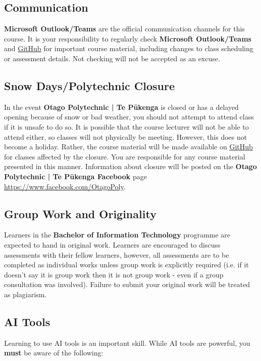\documentclass{article}
\begin{document}
\subsection*{Communication}
\textbf{Microsoft Outlook/Teams} are the official communication channels for this course. It is your responsibility to regularly check \textbf{Microsoft Outlook/Teams} and \href{https://github.com/otago-polytechnic-bit-courses/ID721001-mobile-application-development}{GitHub} for important course material, including changes to class scheduling or assessment details. Not checking will not be accepted as an excuse.

\subsection*{Snow Days/Polytechnic Closure}
In the event \textbf{Otago Polytechnic | Te Pūkenga} is closed or has a delayed opening because of snow or bad weather, you should not attempt to attend class if it is unsafe to do so. It is possible that the course lecturer will not be able to attend either, so classes will not physically be meeting. However, this does not become a holiday. Rather, the course material will be made available on \href{https://github.com/otago-polytechnic-bit-courses/ID721001-mobile-application-development}{GitHub} for classes affected by the closure. You are responsible for any course material presented in this manner. Information about closure will be posted on the \textbf{Otago Polytechnic | Te Pūkenga Facebook} page \href{https://www.facebook.com/OtagoPoly}{https://www.facebook.com/OtagoPoly}.

\subsection*{Group Work and Originality}
Learners in the \textbf{Bachelor of Information Technology} programme are expected to hand in original work. Learners are encouraged to discuss assessments with their fellow learners, however, all assessments are to be completed as individual works unless group work is explicitly required (i.e. if it doesn't say it is group work then it is not group work - even if a group consultation was involved). Failure to submit your original work will be treated as plagiarism.

\subsection*{AI Tools}
Learning to use AI tools is an important skill. While AI tools are powerful, you \textbf{must} be aware of the following:
\end{document}
